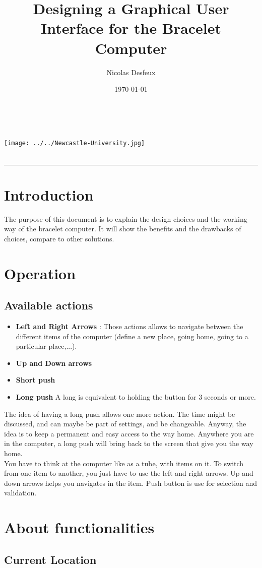 \documentclass[a4paper,12pt]{article} %
\date{\today}
\author{Nicolas Desfeux}
\title{
\Huge{Designing a Graphical User Interface for the Bracelet Computer
}}
\makeatletter
\def\maketitle{

	\begin{multicols}{2}
		{\@author\\\texttt{\@email}}
		\begin{flushright}
			{\texttt{[image: ../../Newcastle-University.jpg]}}\\
			{\@date}\\
		\end{flushright}
	\end{multicols}
	\vspace{1cm}
	\begin{center}
		{\LARGE \@title}
		\rule{10cm}{1pt}
	\end{center}
	\vspace{1cm}
}
\makeatother
\begin{document}
\maketitle


\section*{Introduction}
The purpose of this document is to explain the design choices and the working way of the bracelet computer. It will show the benefits and the drawbacks of choices, compare to other solutions.

\section{Operation}
\subsection{Available actions}
\begin{itemize}
\item \textbf{Left and Right Arrows} :  Those actions allows to navigate between the different items of the computer (define a new place, going home, going to a particular place,...). 
\item \textbf{Up and Down arrows}
\item \textbf{Short push}
\item \textbf{Long push} A long is equivalent to holding the button for 3 seconds or more.
\end{itemize}
The idea of having a long push allows one more action. The time might be discussed, and can maybe be part of settings, and be changeable. Anyway, the idea is to keep a permanent and easy access to the way home. Anywhere you are in the computer, a long push will bring back to the screen that give you the way home.\\
You have to think at the computer like as a tube, with items on it. To switch from one item to another, you just have to use the left and right arrows. Up and down arrows helps you navigates in the item. Push button is use for selection and validation.
\section{About functionalities}
\subsection{Current Location}
\end{document}
